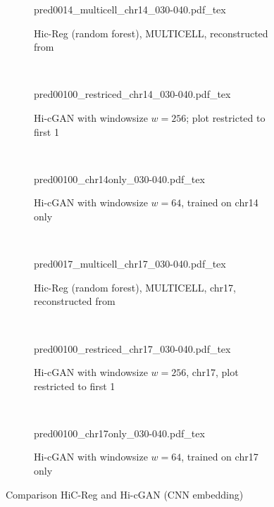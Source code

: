 \begin{figure}[htbp]
\begin{subfigure}{\textwidth}
 \centering
 \scriptsize
 {pred0014_multicell_chr14_030-040.pdf_tex}
 \caption{Hic-Reg (random forest), MULTICELL, reconstructed from \cite{Zhang2019}} \label{fig:results:zhang-vs-ours_matrices_multicell-14}
\end{subfigure}\\[5mm]
\begin{subfigure}{\textwidth}
 \centering
 \scriptsize
 {pred00100_restriced_chr14_030-040.pdf_tex}
 \caption{Hi-cGAN with windowsize $w=256$; plot restricted to first \SI{1}{\mega\bp}} \label{fig:results:zhang-vs-ours_matrices_ours-full-14}
\end{subfigure}\\[5mm]
\begin{subfigure}{\textwidth}
 \centering
 \scriptsize
 {pred00100_chr14only_030-040.pdf_tex}
 \caption{Hi-cGAN with windowsize $w=64$, trained on chr14 only} \label{fig:results:zhang-vs-ours_matrices_ours-only-14}
\end{subfigure}\\[8mm]
\begin{subfigure}{\textwidth}
 \centering
 \scriptsize
 {pred0017_multicell_chr17_030-040.pdf_tex}
 \caption{Hic-Reg (random forest), MULTICELL, chr17, reconstructed from \cite{Zhang2019}} \label{fig:results:zhang-vs-ours_matrices_multicell-17}
\end{subfigure}\\[5mm]
\begin{subfigure}{\textwidth}
 \centering
 \scriptsize
 {pred00100_restriced_chr17_030-040.pdf_tex}
 \caption{Hi-cGAN with windowsize $w=256$, chr17, plot restricted to first \SI{1}{\mega\bp}}\label{fig:results:zhang-vs-ours_matrices_ours-full-17}
\end{subfigure}\\[5mm]
\begin{subfigure}{\textwidth}
 \centering
 \scriptsize
 {pred00100_chr17only_030-040.pdf_tex}
 \caption{Hi-cGAN with windowsize $w=64$, trained on chr17 only} \label{fig:results:zhang-vs-ours_matrices_ours-only-17}
\end{subfigure}
\caption{Comparison HiC-Reg \cite{Zhang2019} and Hi-cGAN (CNN embedding)} \label{fig:results:zhang-vs-ours_matrices}
\end{figure}

